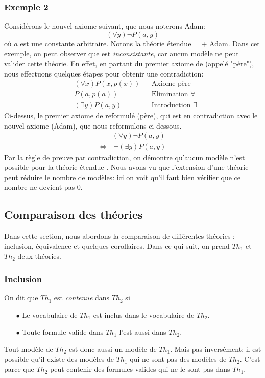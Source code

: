 {\subsubsection{Exemple 2}

Considérons le nouvel axiome suivant, que nous noterons Adam:
$$ (\forall y) \neg P(a,y) $$
où $a$ est une constante arbitraire.
Notons la théorie étendue  =  + Adam. Dans cet exemple, on peut observer que 
est {\em inconsistante}, car aucun modèle ne peut valider cette théorie.
En effet, en partant du premier axiome de  (appelé "père"), nous effectuons quelques étapes pour obtenir une contradiction:
\begin{align*}
& (\forall x) P(x,p(x)) && \textrm{Axiome père} \\
& P(a,p(a)) && \textrm{Elimination } \forall \\
& (\exists y) P(a,y) && \textrm{Introduction } \exists
\end{align*}
Ci-dessus, le premier axiome de  reformulé (père),
qui est en contradiction avec le nouvel axiome (Adam), que nous reformulons ci-dessous.
\begin{align*}
& (\forall y) \neg P(a,y) \\
\Leftrightarrow & \ \neg (\exists y) P(a,y)
\end{align*}
Par la règle de preuve par contradiction, on démontre qu'aucun modèle n'est possible pour la théorie étendue .
Nous avons vu que
l'extension d'une théorie peut réduire le nombre de modèles: ici on voit qu'il faut bien vérifier que ce nombre ne devient pas 0.

\subsection{Comparaison des théories}

Dans cette section, nous abordons la comparaison de différentes théories :
inclusion, équivalence et quelques corollaires.
Dans ce qui suit, on prend $Th_1$ et $Th_2$ deux théories.

\subsubsection{Inclusion}
On dit que $Th_1$ est {\em contenue} dans $Th_2$ si
\begin{itemize}
\item[$\bullet$] Le vocabulaire de $Th_1$ est inclus dans le vocabulaire de $Th_2$.
\item[$\bullet$] Toute formule valide dans $Th_1$ l'est aussi dans $Th_2$.
\end{itemize}
Tout modèle de $Th_2$ est donc aussi un modèle de $Th_1$.
Mais pas inversément: il est possible qu'il existe des modèles de $Th_1$ qui ne sont pas des modèles de $Th_2$.
C'est parce que $Th_2$ peut contenir des formules valides qui ne le sont pas dans $Th_1$.

}
